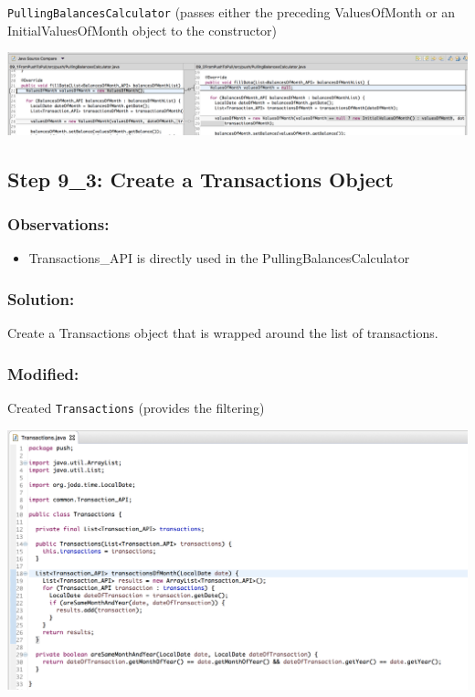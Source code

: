 \documentclass[a4paper,fleqn,titlepage,11pt]{article}
\begin{document}
\texttt{PullingBalancesCalculator} (passes either the preceding ValuesOfMonth or an InitialValuesOfMonth object to the constructor)

\includegraphics[width=1\textwidth]{CompareViews/09_1-09_2-2.png}


\subsection*{Step 9\_3: Create a Transactions Object}

\subsubsection*{Observations:}
\begin{itemize}
\item Transactions\_API is directly used in the PullingBalancesCalculator
\end{itemize}

\subsubsection*{Solution:}

Create a Transactions object that is wrapped around the list of transactions.

\subsubsection*{Modified:}

Created \texttt{Transactions} (provides the filtering)

\includegraphics[width=1\textwidth]{CompareViews/09_3-1.png}
\end{document}
